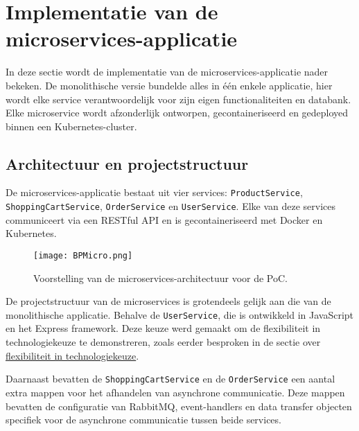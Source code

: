
\section{Implementatie van de microservices-applicatie}

In deze sectie wordt de implementatie van de microservices-applicatie nader bekeken. De monolithische versie bundelde alles in één enkele applicatie, hier wordt elke service verantwoordelijk voor zijn eigen functionaliteiten en databank. Elke microservice wordt afzonderlijk ontworpen, gecontaineriseerd en gedeployed binnen een Kubernetes-cluster.

\subsection{Architectuur en projectstructuur}

De microservices-applicatie bestaat uit vier services: \texttt{ProductService}, \texttt{ShoppingCartService}, \texttt{OrderService} en \texttt{UserService}. Elke van deze services communiceert via een RESTful API en is gecontaineriseerd met Docker en Kubernetes.

\begin{figure}[H]
	\centering
	\texttt{[image: BPMicro.png]}
	\caption[Voorstelling van de microservices-architectuur voor de PoC.]{\label{fig:BPMicro}Voorstelling van de microservices-architectuur voor de PoC.\linebreak}
\end{figure}

De projectstructuur van de microservices is grotendeels gelijk aan die van de monolithische applicatie. Behalve de \texttt{UserService}, die is ontwikkeld in JavaScript en het Express framework. Deze keuze werd gemaakt om de flexibiliteit in technologiekeuze te demonstreren, zoals eerder besproken in de sectie over \hyperref[sec:flexibiliteit_technologiekeuze]{flexibiliteit in technologiekeuze}.

Daarnaast bevatten de \texttt{ShoppingCartService} en de \texttt{OrderService} een aantal extra mappen voor het afhandelen van asynchrone communicatie. Deze mappen bevatten de configuratie van RabbitMQ, event-handlers en data transfer objecten specifiek voor de asynchrone communicatie tussen beide services.

